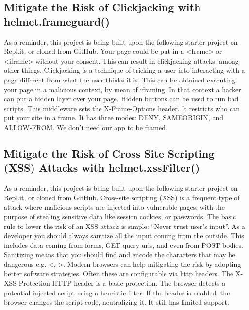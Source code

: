 \documentclass{article}%
\begin{document}
\subsection{Mitigate the Risk of Clickjacking with helmet.frameguard()}%
\label{subsec:MitigatetheRiskofClickjackingwithhelmet.frameguard()}%
As a reminder, this project is being built upon the following starter project on Repl.it, or cloned from GitHub.\newline%
Your page could be put in a <frame> or <iframe> without your consent. This can result in clickjacking attacks, among other things. Clickjacking is a technique of tricking a user into interacting with a page different from what the user thinks it is. This can be obtained executing your page in a malicious context, by mean of iframing. In that context a hacker can put a hidden layer over your page. Hidden buttons can be used to run bad scripts. This middleware sets the X{-}Frame{-}Options header. It restricts who can put your site in a frame. It has three modes: DENY, SAMEORIGIN, and ALLOW{-}FROM.\newline%
We don’t need our app to be framed.\newline%

%
\subsection{Mitigate the Risk of Cross Site Scripting (XSS) Attacks with helmet.xssFilter()}%
\label{subsec:MitigatetheRiskofCrossSiteScripting(XSS)Attackswithhelmet.xssFilter()}%
As a reminder, this project is being built upon the following starter project on Repl.it, or cloned from GitHub.\newline%
Cross{-}site scripting (XSS) is a frequent type of attack where malicious scripts are injected into vulnerable pages, with the purpose of stealing sensitive data like session cookies, or passwords.\newline%
The basic rule to lower the risk of an XSS attack is simple: “Never trust user’s input”. As a developer you should always sanitize all the input coming from the outside. This includes data coming from forms, GET query urls, and even from POST bodies. Sanitizing means that you should find and encode the characters that may be dangerous e.g. <, >.\newline%
Modern browsers can help mitigating the risk by adopting better software strategies. Often these are configurable via http headers.\newline%
The X{-}XSS{-}Protection HTTP header is a basic protection. The browser detects a potential injected script using a heuristic filter. If the header is enabled, the browser changes the script code, neutralizing it.\newline%
It still has limited support.\newline%
\end{document}
